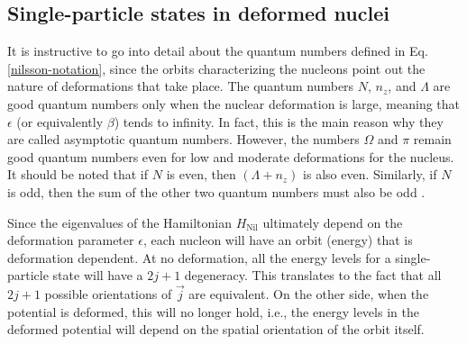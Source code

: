 \subsection{Single-particle states in deformed nuclei}

It is instructive to go into detail about the quantum numbers defined in Eq. \ref{nilsson-notation}, since the orbits characterizing the nucleons point out the nature of deformations that take place. The quantum numbers $N$, $n_z$, and $\Lambda$ are good quantum numbers only when the nuclear deformation is large, meaning that $\epsilon$ (or equivalently $\beta$) tends to infinity. In fact, this is the main reason why they are called asymptotic quantum numbers. However, the numbers $\Omega$ and $\pi$ remain good quantum numbers even for low and moderate deformations for the nucleus. It should be noted that if $N$ is even, then $(\Lambda+n_z)$ is also even. Similarly, if $N$ is odd, then the sum of the other two quantum numbers must also be odd \cite{casten2000nuclear}.

Since the eigenvalues of the Hamiltonian $H_\text{Nil}$ ultimately depend on the deformation parameter $\epsilon$, each nucleon will have an orbit (energy) that is deformation dependent. At no deformation, all the energy levels for a single-particle state will have a $2j+1$ degeneracy. This translates to the fact that all $2j+1$ possible orientations of $\vec{j}$ are equivalent. On the other side, when the potential is deformed, this will no longer hold, i.e., the energy levels in the deformed potential will depend on the spatial orientation of the orbit itself.

